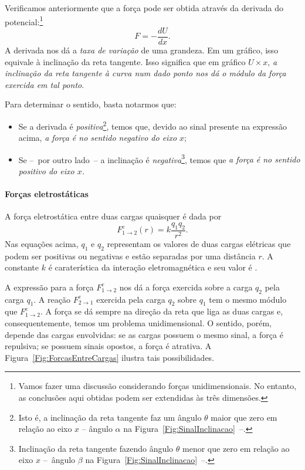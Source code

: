 Verificamos anteriormente que a força pode ser obtida através da derivada do potencial:\footnote{Vamos fazer uma discussão considerando forças unidimensionais. No entanto, as conclusões aqui obtidas podem ser extendidas às três dimensões.}
\begin{equation*}
    F = -\frac{dU}{dx}.
\end{equation*}
%
A derivada nos dá a \emph{taxa de variação} de uma grandeza. Em um gráfico, isso equivale à inclinação da reta tangente. Isso significa que em gráfico $U \times x$, \emph{a inclinação da reta tangente à curva num dado ponto nos dá o módulo da força exercida em tal ponto}.

Para determinar o sentido, basta notarmos que:
\begin{itemize}
    \item Se a derivada é \emph{positiva}\footnote{Isto é, a inclinação da reta tangente faz um ângulo $\theta$ maior que zero em relação ao eixo $x$ -- ângulo $\alpha$ na Figura~\ref{Fig:SinalInclinacao}~--.}, temos que, devido ao sinal presente na expressão acima, \emph{a força é no sentido negativo do eixo $x$};
    \item Se --~por outro lado~-- a inclinação é \emph{negativa}\footnote{Inclinação da reta tangente fazendo ângulo $\theta$ menor que zero em relação ao eixo $x$ --~ângulo $\beta$ na Figura~\ref{Fig:SinalInclinacao}~--.}, temos que \emph{a força é no sentido positivo do eixo $x$.}
\end{itemize}

\paragraph{Forças eletrostáticas}

A força eletrostática entre duas cargas quaisquer é dada por
\begin{equation}
    F_{1\to 2}^e(r) = k \frac{q_1 q_2}{r^2}.
\end{equation}
%
Nas equações acima, $q_1$ e $q_2$ representam os valores de duas cargas elétricas que podem ser positivas ou negativas e estão separadas por uma distância $r$. A constante $k$ é caraterística da interação eletromagnética e seu valor é .

A expressão para a força $F_{1\to 2}^e$ nos dá a força exercida sobre a carga $q_2$ pela carga $q_1$. A reação $F_{2\to 1}^e$ exercida pela carga $q_2$ sobre $q_1$ tem o mesmo módulo que $F_{1\to 2}^e$. A força se dá sempre na direção da reta que liga as duas cargas e, consequentemente, temos um problema unidimensional. O sentido, porém, depende das cargas envolvidas: se as cargas possuem o mesmo sinal, a força é repulsiva; se possuem sinais opostos, a força é atrativa. A Figura~\ref{Fig:ForcasEntreCargas} ilustra tais possibilidades.

